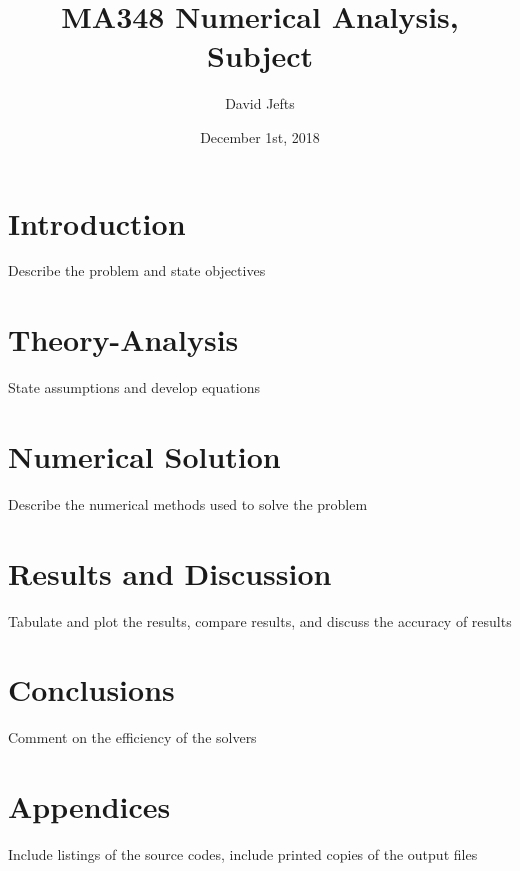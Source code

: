 \documentclass[12pt, letterpaper]{article}
\begin{document}
\setcounter{secnumdepth}{-1}

\title{MA348 Numerical Analysis, Subject}
\author{David Jefts}
\date{December 1st, 2018}
\begin{titlepage}
	\centering
	\maketitle
	\centering
	\hfill
	\vfill
\end{titlepage}


\section{Introduction}
	Describe the problem and state objectives

\section{Theory-Analysis}
State assumptions and develop equations

\section{Numerical Solution}
	Describe the numerical methods used to solve the problem

\section{Results and Discussion}
	Tabulate and plot the results, compare results, and discuss the accuracy of results
	
\section{Conclusions}
	Comment on the efficiency of the solvers
	
\section{Appendices}
	Include listings of the source codes, include printed copies of the output files
\end{document}
